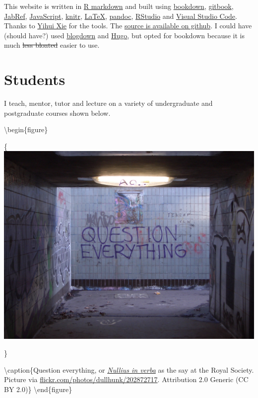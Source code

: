 \documentclass[12pt,]{book}
\begin{document}
This website is written in \href{https://rmarkdown.rstudio.com/}{R markdown} and built using \href{https://bookdown.org}{bookdown}, \href{https://www.gitbook.com}{gitbook}, \href{http://www.jabref.org/}{JabRef}, \href{https://en.wikipedia.org/wiki/JavaScript}{JavaScript}, \href{https://en.wikipedia.org/wiki/Knitr}{knitr}, \href{https://en.wikipedia.org/wiki/LaTeX}{LaTeX}, \href{https://pandoc.org/}{pandoc}, \href{https://www.rstudio.com/}{RStudio} and \href{https://code.visualstudio.com/}{Visual Studio Code}. Thanks to \href{https://yihui.name/}{Yihui Xie} for the tools. The \href{https://github.com/dullhunk/hulled}{source is available on github}. I could have (should have?) used \href{https://bookdown.org/yihui/blogdown/}{blogdown} and \href{https://gohugo.io}{Hugo}, but opted for bookdown because it is much \sout{less bloated} easier to use. 🔨

\hypertarget{teaching}{%
\chapter{Students}\label{teaching}}

I teach, mentor, tutor and lecture on a variety of undergraduate and postgraduate courses shown below.

\textbackslash{}begin\{figure\}

\{\centering \includegraphics[width=0.75\linewidth]{images/question-everything}

\}

\textbackslash{}caption\{Question everything, or \emph{\href{https://en.wikipedia.org/wiki/Nullius_in_verba}{Nullius in verba}} as the say at the Royal Society. Picture via \href{https://www.flickr.com/photos/dullhunk/202872717}{flickr.com/photos/dullhunk/202872717}. Attribution 2.0 Generic (CC BY 2.0)\}\label{fig:unnamed-chunk-2}
\textbackslash{}end\{figure\}
\end{document}
